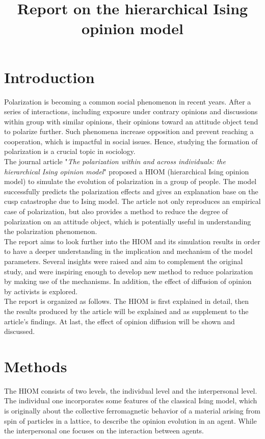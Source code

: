 \documentclass{article}
\title{\textbf{Report on the hierarchical Ising opinion model}}
\date{}
\begin{document}
\maketitle

\section{Introduction}
Polarization is becoming a common social phenomenon in recent years\cite{abramowitz2008polarization}. After a series of interactions, 
including exposure under contrary opinions\cite{bail2018exposure} and discussions within group with similar opinions\cite{smith2024polarization},
their opinions toward an attitude object tend to polarize further. Such phenomena increase opposition and prevent reaching a cooperation, which is impactful
in social issues. Hence, studying the formation of polarization is a crucial topic in sociology.\\

The journal article "\textit{The polarization within and across individuals: the hierarchical Ising opinion model}"\cite{van2020polarization} proposed a 
HIOM (hierarchical Ising opinion model) to simulate the evolution of polarization in a group of people. The model successfully predicts the polarization effects
and gives an explanation base on the cusp catastrophe due to Ising model. The article not only reproduces an empirical case of polarization, but also provides a method to 
reduce the degree of polarization on an attitude object, which is potentially useful in understanding the polarization phenomenon.\\

The report aims to look further into the HIOM and its simulation results in order to have a deeper understanding in the implication and mechanism of the model
parameters. Several insights were raised and aim to complement the original study, and were inspiring enough to develop new method to reduce polarization by making use of 
the mechanisms. In addition, the effect of diffusion of opinion by activists is explored.\\

The report is organized as follows. The HIOM is first explained in detail, then the results produced by the article will be explained and as supplement to
the article's findings. At last, the effect of opinion diffusion will be shown and discussed.

\section{Methods}
The HIOM consists of two levels, the individual level and the interpersonal level. The individual one incorporates some features of the classical Ising model,
which is originally about the collective ferromagnetic behavior of a material arising from spin of particles in a lattice\cite{budrikis2024100}, 
to describe the opinion evolution in an agent. While the interpersonal one focuses on the interaction between agents.
\end{document}
